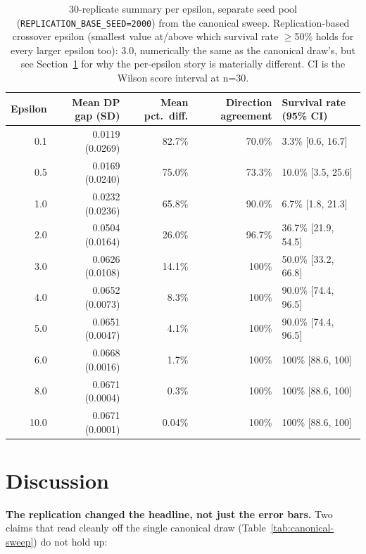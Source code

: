 \documentclass[11pt]{article}
\begin{document}
\begin{table}[H]
\centering
\begin{tabular}{rrrrl}
\toprule
Epsilon & Mean DP gap (SD) & Mean pct.\ diff. & Direction agreement & Survival rate (95\% CI) \\
\midrule
0.1 & 0.0119 (0.0269) & 82.7\% & 70.0\% & 3.3\% [0.6, 16.7] \\
0.5 & 0.0169 (0.0240) & 75.0\% & 73.3\% & 10.0\% [3.5, 25.6] \\
1.0 & 0.0232 (0.0236) & 65.8\% & 90.0\% & 6.7\% [1.8, 21.3] \\
2.0 & 0.0504 (0.0164) & 26.0\% & 96.7\% & 36.7\% [21.9, 54.5] \\
3.0 & 0.0626 (0.0108) & 14.1\% & 100\% & 50.0\% [33.2, 66.8] \\
4.0 & 0.0652 (0.0073) & 8.3\% & 100\% & 90.0\% [74.4, 96.5] \\
5.0 & 0.0651 (0.0047) & 4.1\% & 100\% & 90.0\% [74.4, 96.5] \\
6.0 & 0.0668 (0.0016) & 1.7\% & 100\% & 100\% [88.6, 100] \\
8.0 & 0.0671 (0.0004) & 0.3\% & 100\% & 100\% [88.6, 100] \\
10.0 & 0.0671 (0.0001) & 0.04\% & 100\% & 100\% [88.6, 100] \\
\bottomrule
\end{tabular}
\caption{30-replicate summary per epsilon, separate seed pool (\texttt{REPLICATION\_BASE\_SEED=2000}) from the canonical sweep. Replication-based crossover epsilon (smallest value at/above which survival rate $\geq$50\% holds for every larger epsilon too): 3.0, numerically the same as the canonical draw's, but see Section~\ref{sec:discussion} for why the per-epsilon story is materially different. CI is the Wilson score interval at n=30.}
\label{tab:replication}
\end{table}

\section{Discussion}
\label{sec:discussion}

\textbf{The replication changed the headline, not just the error bars.} Two claims that read cleanly off the single canonical draw (Table~\ref{tab:canonical-sweep}) do not hold up:
\end{document}
